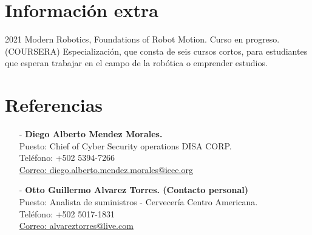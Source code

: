 \documentclass[]{twentysecondcv}
\begin{document}
\section{Informaci\'on extra}

\begin{twenty}

	\twentyitem
    	{2021}
    	{Modern Robotics, Foundations of Robot Motion.}
    	{Curso en progreso. (COURSERA)}
    	{Especializaci\'on, que consta de seis cursos cortos, para estudiantes que esperan trabajar en el campo de la rob\'otica o emprender estudios.}
    	
    
\end{twenty}

\section{Referencias}

\begin{itemize}






	\item[-] \textbf{Diego Alberto Mendez Morales.}\\
		Puesto: Chief of Cyber Security operations DISA CORP.\\
		Tel\'efono: +502 5394-7266\\
		\href{diego.alberto.mendez.morales@ieee.org}{Correo: diego.alberto.mendez.morales@ieee.org}\\




	\item[-] \textbf{Otto Guillermo Alvarez Torres. (Contacto personal)}\\
		Puesto: Analista de suministros - Cervecer\'ia Centro Americana.\\
		Tel\'efono: +502 5017-1831\\
		\href{alvareztorres@live.com}{Correo: alvareztorres@live.com}\\


\end{itemize}



\end{document}
